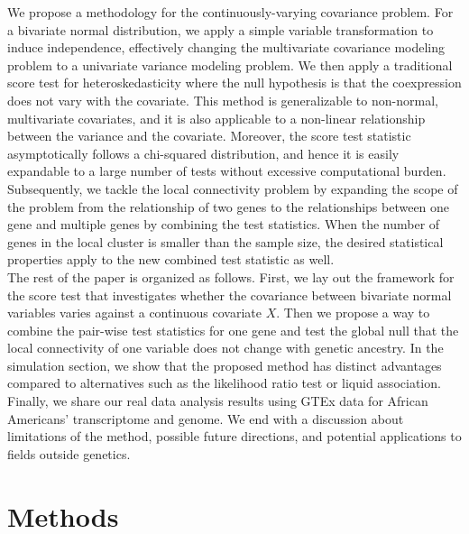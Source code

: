 \documentclass[aap, preprint]{imsart}
\numberwithin{equation}{section}
\theoremstyle{plain}
\begin{document}
We propose a methodology for the continuously-varying covariance problem. For a bivariate normal distribution, we apply a simple variable transformation to induce independence, effectively changing the multivariate covariance modeling problem to a univariate variance modeling problem. We then apply a traditional score test for heteroskedasticity \cite{breusch1979simple} where the null hypothesis is that the coexpression does not vary with the covariate. This method is generalizable to non-normal, multivariate covariates, and it is also applicable to a non-linear relationship between the variance and the covariate. Moreover, the score test statistic asymptotically follows a chi-squared distribution, and hence it is easily expandable to a large number of tests without excessive computational burden. Subsequently, we tackle the local connectivity problem by expanding the scope of the problem from the relationship of two genes to the relationships between one gene and multiple genes by combining the test statistics. When the number of genes in the local cluster is smaller than the sample size, the desired statistical properties apply to the new combined test statistic as well. \\

The rest of the paper is organized as follows. First, we lay out the framework for the score test that investigates whether the covariance between bivariate normal variables varies against a continuous covariate $X$. Then we propose a way to combine the pair-wise test statistics for one gene and test the global null that the local connectivity of one variable does not change with genetic ancestry. In the simulation section, we show that the proposed method has distinct advantages compared to alternatives such as the likelihood ratio test or liquid association. Finally, we share our real data analysis results using GTEx data for African Americans' transcriptome and genome. We end with a discussion about limitations of the method, possible future directions, and potential applications to fields outside genetics.


\section{Methods}
\end{document}
